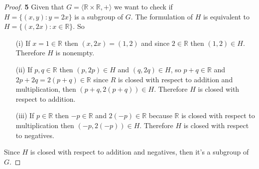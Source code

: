 \documentclass[11pt]{article}
\begin{document}
\cleardoublepage
	\begin{proof}{\textbf{5}}
		Given that $G = \langle \mathbb{R} \times \mathbb{R}, + \rangle$ we want to check if \\
		$H = \{(x,y): y=2x\}$ is a subgroup of $G$. The formulation of $H$ is equivalent to $H = \{(x,2x): x \in \mathbb{R}\}$. So
		\begin{itemize}
			\item[(i)] If $x=1 \in \mathbb{R}$ then $(x,2x) = (1,2)$ and since $2 \in \mathbb{R}$ then $(1,2) \in H$. Therefore $H$ is nonempty.
			\item[(ii)] If $p,q \in \mathbb{R}$ then $(p,2p) \in H$ and $(q,2q) \in H$, so $p+q \in \mathbb{R}$ and $2p+2q=2(p+q) \in \mathbb{R}$ since $R$ is closed with respect to addition and multiplication, then $(p+q,2(p+q)) \in H$. Therefore $H$ is closed with respect to addition.
			\item[(iii)] If $p \in \mathbb{R}$ then $-p \in \mathbb{R}$ and $2(-p) \in \mathbb{R}$ because $\mathbb{R}$ is closed with respect to multiplication then $(-p, 2(-p)) \in H$. Therefore $H$ is closed with respect to negatives.
		\end{itemize}
	Since $H$ is closed with respect to addition and negatives, then it's a subgroup of $G$.
	\end{proof}

\cleardoublepage
\end{document}
